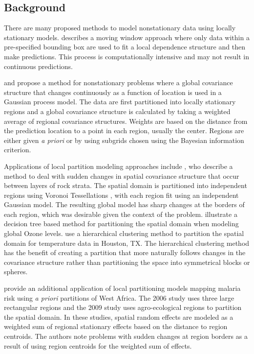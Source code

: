 \subsection{Background}

There are many proposed methods to model nonstationary data using locally stationary models. \citet{haas_lognormal_1990, haas_kriging_1990} describes a moving window approach where only data within a pre-specified bounding box are used to fit a local dependence structure and then make predictions. This process is computationally intensive and may not result in continuous predictions. 

\citet{fuentes_high_2001} and \citet{fuentes_new_2001} propose a method for nonstationary problems where a global covariance structure that changes continuously as a function of location is used in a Gaussian process model. The data are first partitioned into locally stationary regions and a global covariance structure is calculated by taking a weighted average of regional covariance structures. Weights are based on the distance from the prediction location to a point in each region, usually the center. Regions are either given \emph{a priori} or by using subgrids chosen using the Bayesian information criterion.

Applications of local partition modeling approaches include \citet{kim_analyzing_2005}, who describe a method to deal with sudden changes in spatial covariance structure that occur between layers of rock strata. The spatial domain is partitioned into independent regions using Voronoi Tessellations \citep{green1978}, with each region fit using an independent Gaussian model. The resulting global model has sharp changes at the borders of each region, which was desirable given the context of the problem. \citet{konomi_adaptive_2014} illustrate a decision tree based method for partitioning the spatial domain when modeling global Ozone levels. \citet{heaton_nonstationary_2017} use a hierarchical clustering method to partition the spatial domain for temperature data in Houston, TX. The hierarchical clustering method has the benefit of creating a partition that more naturally follows changes in the covariance structure rather than partitioning the space into symmetrical blocks or spheres.

\citet{gosoniu_bayesian_2006, gosoniu_mapping_2009} provide an additional application of local partitioning models mapping malaria risk using \emph{a priori} partitions of West Africa. The 2006 study uses three large rectangular regions and the 2009 study uses agro-ecological regions to partition the spatial domain. In these studies, spatial random effects are modeled as a weighted sum of regional stationary effects based on the distance to region centroids. The authors note problems with sudden changes at region borders as a result of using region centroids for the weighted sum of effects.

